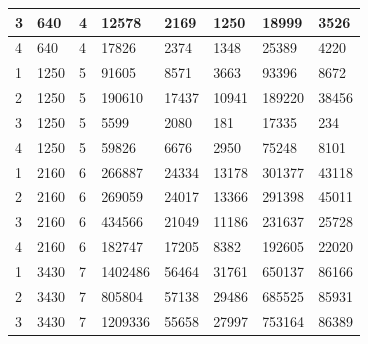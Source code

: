 \documentclass[nocopyrightspace]{acm_proc_article-sp}
\begin{document}
\begin{table}
\begin{tabular}{|l|l|l|l|l|l|l|l|}
3        & 640  & 4 & 12578                                                    & 2169         & 1250           & 18999            & 3526               \\ \hline
4        & 640  & 4 & 17826                                                    & 2374         & 1348           & 25389            & 4220               \\ \hline
1        & 1250 & 5 & 91605                                                    & 8571         & 3663           & 93396            & 8672               \\ \hline
2        & 1250 & 5 & 190610                                                   & 17437        & 10941          & 189220           & 38456              \\ \hline
3        & 1250 & 5 & 5599                                                     & 2080         & 181            & 17335            & 234                \\ \hline
4        & 1250 & 5 & 59826                                                    & 6676         & 2950           & 75248            & 8101               \\ \hline
1        & 2160 & 6 & 266887                                                   & 24334        & 13178          & 301377           & 43118              \\ \hline
2        & 2160 & 6 & 269059                                                   & 24017        & 13366          & 291398           & 45011              \\ \hline
3        & 2160 & 6 & 434566                                                   & 21049        & 11186          & 231637           & 25728              \\ \hline
4        & 2160 & 6 & 182747                                                   & 17205        & 8382           & 192605           & 22020              \\ \hline
1        & 3430 & 7 & 1402486                                                  & 56464        & 31761          & 650137           & 86166              \\ \hline
2        & 3430 & 7 & 805804                                                   & 57138        & 29486          & 685525           & 85931              \\ \hline
3        & 3430 & 7 & 1209336                                                  & 55658        & 27997          & 753164           & 86389              \\ \hline

\end{tabular}
\end{table}
\end{document}
